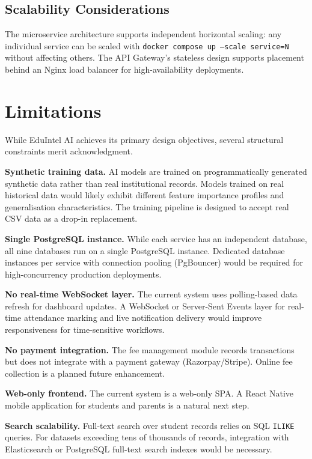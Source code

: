 \documentclass[conference]{IEEEtran}
\begin{document}
\subsection{Scalability Considerations}

The microservice architecture supports independent horizontal scaling: any
individual service can be scaled with \texttt{docker compose up --scale
service=N} without affecting others. The API Gateway's stateless design supports
placement behind an Nginx load balancer for high-availability deployments.

\section{Limitations}

While EduIntel AI achieves its primary design objectives, several structural
constraints merit acknowledgment.

\textbf{Synthetic training data.} AI models are trained on programmatically
generated synthetic data rather than real institutional records. Models trained
on real historical data would likely exhibit different feature importance
profiles and generalisation characteristics. The training pipeline is designed
to accept real CSV data as a drop-in replacement.

\textbf{Single PostgreSQL instance.} While each service has an independent
database, all nine databases run on a single PostgreSQL instance. Dedicated
database instances per service with connection pooling (PgBouncer) would be
required for high-concurrency production deployments.

\textbf{No real-time WebSocket layer.} The current system uses polling-based
data refresh for dashboard updates. A WebSocket or Server-Sent Events layer for
real-time attendance marking and live notification delivery would improve
responsiveness for time-sensitive workflows.

\textbf{No payment integration.} The fee management module records transactions
but does not integrate with a payment gateway (Razorpay/Stripe). Online fee
collection is a planned future enhancement.

\textbf{Web-only frontend.} The current system is a web-only SPA. A React
Native mobile application for students and parents is a natural next step.

\textbf{Search scalability.} Full-text search over student records relies on
SQL \texttt{ILIKE} queries. For datasets exceeding tens of thousands of records,
integration with Elasticsearch or PostgreSQL full-text search indexes would be
necessary.
\end{document}
